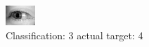 \begin{figure}[h!]
\begin{center}
\includegraphics[width=0.60\columnwidth]{figures/ID3186_class_3_target_4.png}
\end{center}
\caption{ Classification: 3 actual target: 4}
\label{fig:ID3186_class_3_target_4}
\end{figure}
